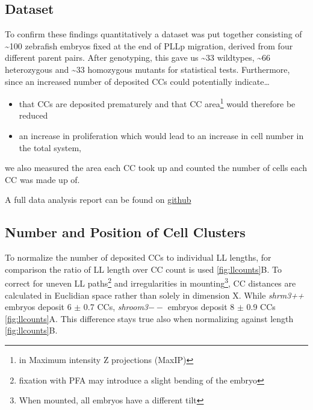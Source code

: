 \documentclass[11pt,singlespacinge,twoside]{reedthesis} %
\providecommand{\tightlist}{%
  \setlength{\itemsep}{0pt}\setlength{\parskip}{0pt}}
\begin{document}
\hypertarget{dataset}{%
\subsection{Dataset}\label{dataset}}

To confirm these findings quantitatively a dataset was put together consisting of \textasciitilde{}100 zebrafish embryos fixed at the end of PLLp migration, derived from four different parent pairs. After genotyping, this gave us \textasciitilde{}33 wildtypes, \textasciitilde{}66 heterozygous and \textasciitilde{}33 homozygous mutants for statistical tests. Furthermore, since an increased number of deposited CCs could potentially indicate\ldots{}
\begin{itemize}
\tightlist
\item
  that CCs are deposited prematurely and that CC area\footnote{in Maximum intensity Z projections (MaxIP)} would therefore be reduced
\item
  an increase in proliferation which would lead to an increase in cell number in the total system,
\end{itemize}
we also measured the area each CC took up and counted the number of cells each CC was made up of.

A full data analysis report can be found on \href{https://github.com/KleinhansDa/reports/blob/master/b7a875fc1ea228b9061041b7cec4bd3c52ab3ce3/clusters_eom.html}{github}

\hypertarget{res-ccounts}{%
\subsection{Number and Position of Cell Clusters}\label{res-ccounts}}

To normalize the number of deposited CCs to individual LL lengths, for comparison the ratio of LL length over CC count is used \ref{fig:llcounts}B. To correct for uneven LL paths\footnote{fixation with PFA may introduce a slight bending of the embryo} and irregularities in mounting\footnote{When mounted, all embryos have a different tilt}, CC distances are calculated in Euclidian space rather than solely in dimension X. While \emph{shrm3++} embryos deposit 6 \(\pm\) 0.7 CCs, \emph{shroom3}\(--\) embryos deposit 8 \(\pm\) 0.9 CCs \ref{fig:llcounts}A. This difference stays true also when normalizing against length \ref{fig:llcounts}B.
\end{document}
